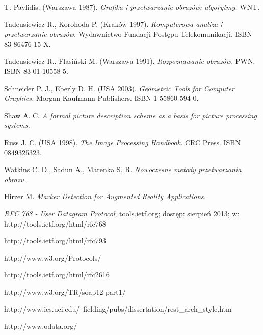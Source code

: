 \begin{thebibliography}{}

  T. Pavlidis.
  (Warszawa 1987).
  \emph{Grafika i przetwarzanie obrazów: algorytmy.}
  WNT.

  Tadeusiewicz R., Korohoda P.
  (Kraków 1997).
  \emph{Komputerowa analiza i przetwarzanie obrazów.}
  Wydawnictwo Fundacji Postępu Telekomunikacji.
  ISBN 83-86476-15-X.

  Tadeusiewicz R., Flasiński M.
  (Warszawa 1991).
  \emph{Rozpoznawanie obrazów.}
  PWN.
  ISBN 83-01-10558-5.
  
  Schneider P. J., Eberly D. H.
  (USA 2003).
  \emph{Geometric Tools for Computer Graphics.}
  Morgan Kaufmann Publishers.
  ISBN 1-55860-594-0.
 
  Shaw A. C.
  \emph{A formal picture description scheme as a basis for picture processing systems.}
 
  Russ J. C.
  (USA 1998).
  \emph{The Image Processing Handbook.}
  CRC Press.
  ISBN 0849325323.
 
  Watkins C. D., Sadun A., Marenka S. R.
  \emph{Nowoczesne metody przetwarzania obrazu.}
 
  Hirzer M.
  \emph{Marker Detection for Augmented Reality Applications.}
 
  \emph{RFC 768 - User Datagram Protocol};
  tools.ietf.org;
  dostęp: sierpień 2013;
  w: http://tools.ietf.org/html/rfc768
 
  http://tools.ietf.org/html/rfc793
 
  http://www.w3.org/Protocols/
 
  http://tools.ietf.org/html/rfc2616
 
  http://www.w3.org/TR/soap12-part1/
 
  http://www.ics.uci.edu/~fielding/pubs/dissertation/rest\_arch\_style.htm
 
  http://www.odata.org/
                
\end{thebibliography}
